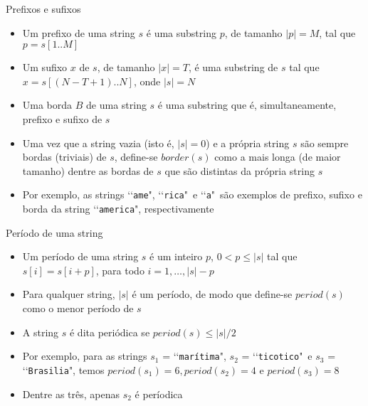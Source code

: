 \begin{frame}[fragile]{Prefixos e sufixos}

    \begin{itemize}
        \item Um prefixo de uma string $s$ é uma substring $p$, de tamanho $|p| = M$, tal que 
            $p = s[1..M]$

        \item Um sufixo $x$ de $s$, de tamanho $|x| = T$, é uma substring de $s$ tal que 
            $x = s[(N - T + 1)..N]$, onde $|s| = N$

        \item Uma borda $B$ de uma string $s$ é uma substring que é, simultaneamente, prefixo e 
            sufixo de $s$

        \item Uma vez que a string vazia (isto é, $|s| = 0$) e a própria string $s$ são sempre 
            bordas (triviais) de $s$, define-se $border(s)$ como a mais longa 
            (de maior tamanho) dentre as bordas de $s$ que são distintas da própria string $s$

        \item Por exemplo, as strings \lq\lq\texttt{ame}", \lq\lq\texttt{rica}"\ e 
            \lq\lq\texttt{a}"\ são exemplos 
            de prefixo, sufixo e borda da string \lq\lq\texttt{america}", respectivamente
    \end{itemize}

\end{frame}


\begin{frame}[fragile]{Período de uma string}

    \begin{itemize}

        \item Um período de uma string $s$ é um inteiro $p$, $0 < p \leq |s|$ tal que 
            $s[i] = s[i + p]$, para todo $i = {1, \ldots, |s| - p}$

        \item Para qualquer string, $|s|$ é um período, de modo que define-se 
            $period(s)$ como o menor período de $s$

        \item A string $s$ é dita periódica se $period(s) \leq |s|/2$

        \item Por exemplo, para as strings $s_1$ = \lq\lq\texttt{marítima}", 
            $s_2$ = \lq\lq\texttt{ticotico}"\ e $s_3$ = \lq\lq\texttt{Brasilia}", temos 
            $period(s_1) = 6, period(s_2) = 4$ e $period(s_3) = 8$

        \item Dentre as três, apenas $s_2$ é períodica
    \end{itemize}

\end{frame}


